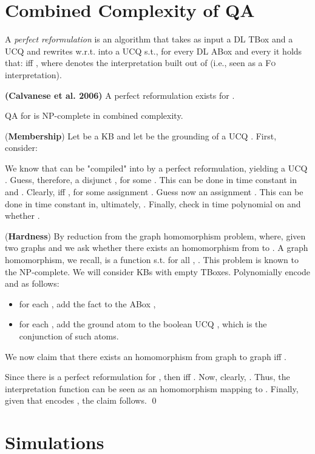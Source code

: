 \documentclass[11pt]{llncs}
\newcommand{\e}[1]{{\bf #1}}
\newcommand{\logic}[1]{\textsc{#1}\xspace}
\newcommand{\FOL}{\logic{Fo}}
\newcommand{\g}[1]{\logic{#1}}
\newcommand{\NP}{\textsc{NP}\xspace}
\begin{document}
\section{Combined Complexity of \g{QA}}\label{two}


A {\em perfect reformulation} is an algorithm
that takes as input a DL TBox  and a UCQ 
and rewrites  w.r.t.  into a UCQ
 s.t., for every DL ABox
 and every  it holds that:
 iff ,
where  denotes the interpretation built out of 
(i.e.,  seen as a \FOL interpretation).

\begin{proposition}
{\bf (Calvanese et al. 2006)}
A perfect reformulation exists for .
\end{proposition}

\begin{theorem}
QA for  is \NP-complete in combined complexity.
\end{theorem}

\proof 
(\e{Membership}) Let  be a
KB and let  be the grounding of a UCQ .
First, consider:

We know that
 can be "compiled" into  by a perfect reformulation, yielding a
UCQ
. Guess, therefore, a disjunct
, for some .
This can be done in time constant in  and .
Clearly,  iff
, for
some assignment . 
Guess now an assignment . 
This can be done in time constant in, ultimately, .
Finally, check in
time polynomial on  and  whether
.

(\e{Hardness}) By reduction from the graph homomorphism problem, where, given
two graphs  and 
we ask whether there exists an homomorphism  from  to . 
A graph homomorphism, we recall, is a function  s.t.
for all , .
This problem is known to the \NP-complete.
We will consider  KBs with empty TBoxes.
Polynomially encode  and  as follows:
\begin{itemize}
\item for each , add the fact 
to the ABox ,
\item for each , add the ground atom 
to the boolean UCQ , which is the conjunction of such atoms.
\end{itemize}

We now claim that
there exists an homomorphism  from graph  to graph 
iff .

Since there is a perfect reformulation for , then
 iff .
Now, clearly, .
Thus, the interpretation function  can be seen as an homomorphism mapping
 to . Finally, given that  encodes , the claim
follows. \qed

\section{ Simulations}\label{three}
\end{document}
